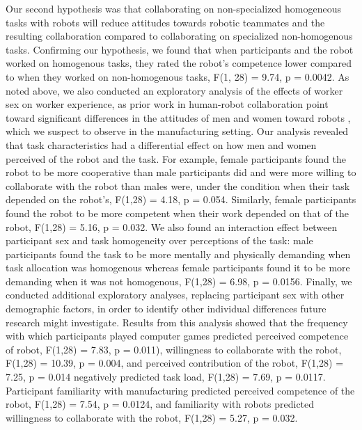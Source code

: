 Our second hypothesis was that collaborating on non-specialized homogeneous tasks with robots will reduce attitudes towards robotic teammates and the resulting collaboration compared to collaborating on specialized non-homogenous tasks. Confirming our hypothesis, we found that when participants and the robot worked on homogenous tasks, they rated the robot’s competence lower compared to when they worked on non-homogenous tasks, F(1, 28) = 9.74, p = 0.0042. 
       As noted above, we also conducted an exploratory analysis of the effects of worker sex on worker experience, as prior work in human-robot collaboration point toward significant differences in the attitudes of men and women toward robots \cite{schermerhorn2008robot}, which we suspect to observe in the manufacturing setting. Our analysis revealed that task characteristics had a differential effect on how men and women perceived of the robot and the task. For example, female participants found the robot to be more cooperative than male participants did and were more willing to collaborate with the robot than males were, under the condition when their task depended on the robot’s, F(1,28) = 4.18, p = 0.054. Similarly, female participants found the robot to be more competent when their work depended on that of the robot, F(1,28) = 5.16, p = 0.032. We also found an interaction effect between participant sex and task homogeneity over perceptions of the task: male participants found the task to be more mentally and physically demanding when task allocation was homogenous whereas female participants found it to be more demanding when it was not homogenous, F(1,28) = 6.98, p = 0.0156.
       Finally, we conducted additional exploratory analyses, replacing participant sex with other demographic factors, in order to identify other individual differences future research might investigate. Results from this analysis showed that the frequency with which participants played computer games predicted perceived competence of robot, F(1,28) = 7.83, p = 0.011), willingness to collaborate with the robot, F(1,28) = 10.39, p = 0.004, and perceived contribution of the robot, F(1,28) = 7.25, p = 0.014 negatively predicted task load, F(1,28) = 7.69, p = 0.0117. Participant familiarity with manufacturing predicted perceived competence of the robot, F(1,28) = 7.54, p = 0.0124, and familiarity with robots predicted willingness to collaborate with the robot, F(1,28) = 5.27, p = 0.032.